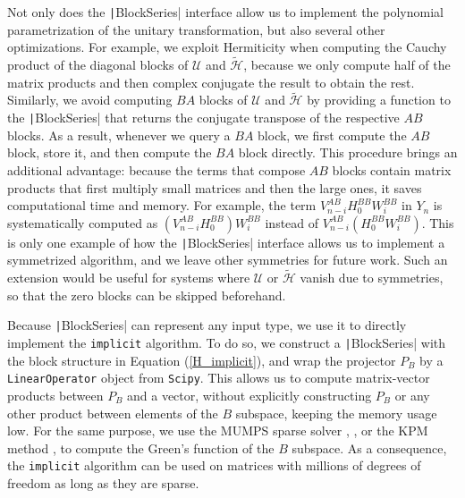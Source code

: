 Not only does the \texttt|BlockSeries| interface allow us to implement the polynomial
parametrization of the unitary transformation, but also several other
optimizations.
For example, we exploit Hermiticity when computing the Cauchy product of the
diagonal blocks of $\mathcal{U}$ and $\tilde{\mathcal{H}}$, because we only
compute half of the matrix products and then complex conjugate the result to
obtain the rest.
Similarly, we avoid computing $BA$ blocks of $\mathcal{U}$ and
$\tilde{\mathcal{H}}$ by providing a function to the \texttt|BlockSeries| that returns
the conjugate transpose of the respective $AB$ blocks.
As a result, whenever we query a $BA$ block, we first compute the $AB$ block,
store it, and then compute the $BA$ block directly.
This procedure brings an additional advantage: because the terms that compose
$AB$ blocks contain matrix products that first multiply small matrices and then
the large ones, it saves computational time and memory.
For example, the term $V_{n -i}^{AB} H_0^{BB}
W_i^{BB}$ in $Y_n$ is systematically computed as $(V_{n -i}^{AB}
H_0^{BB}) W_i^{BB}$ instead of $V_{n -i}^{AB}
(H_0^{BB} W_i^{BB})$.
This is only one example of how the \texttt|BlockSeries| interface allows us to
implement a symmetrized algorithm, and we leave other symmetries for future
work.
Such an extension would be useful for systems where $\mathcal{U}$ or
$\tilde{\mathcal{H}}$ vanish due to symmetries, so that the zero blocks can be
skipped beforehand.

Because \texttt|BlockSeries| can represent any input type, we use it to directly
implement the \texttt{implicit} algorithm.
To do so, we construct a \texttt|BlockSeries| with the block structure in Equation
(\ref{H_implicit}), and wrap the projector $P_B$ by a \texttt{LinearOperator} object
from \texttt{Scipy}.
This allows us to compute matrix-vector products between $P_B$ and a vector,
without explicitly constructing $P_B$ or any other product between elements of
the $B$ subspace, keeping the memory usage low.
For the same purpose, we use the MUMPS sparse solver
\cite{Amestoy_2001},
\cite{Amestoy_2006}, or the KPM method
\cite{Wei_e_2006}, to compute the Green's function of the
$B$ subspace.
As a consequence, the \texttt{implicit} algorithm can be used on matrices with
millions of degrees of freedom as long as they are sparse.

